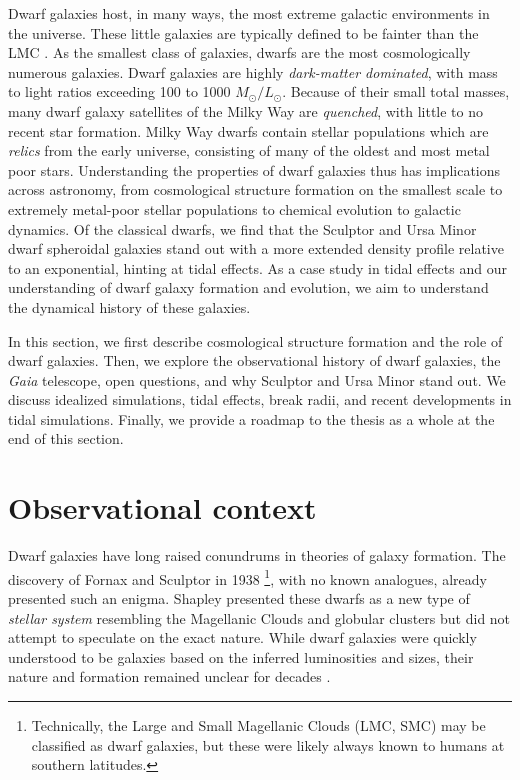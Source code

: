 Dwarf galaxies host, in many ways, the most extreme galactic
environments in the universe. These little galaxies are typically
defined to be fainter than the LMC \citep[\(M_V \gtrsim -18\) or
similarly \(L \lesssim 10^9 L_\odot\),
e.g.,][]{hodge1971, mcconnachie2012}. As the smallest class of galaxies,
dwarfs are the most cosmologically numerous galaxies. Dwarf galaxies are
highly \emph{dark-matter dominated}, with mass to light ratios exceeding
100 to 1000 \(M_\odot/ L_\odot\). Because of their small total masses,
many dwarf galaxy satellites of the Milky Way are \emph{quenched}, with
little to no recent star formation. Milky Way dwarfs contain stellar
populations which are \emph{relics} from the early universe, consisting
of many of the oldest and most metal poor stars. Understanding the
properties of dwarf galaxies thus has implications across astronomy,
from cosmological structure formation on the smallest scale to extremely
metal-poor stellar populations to chemical evolution to galactic
dynamics. Of the classical dwarfs, we find that the Sculptor and Ursa
Minor dwarf spheroidal galaxies stand out with a more extended density
profile relative to an exponential, hinting at tidal effects. As a case
study in tidal effects and our understanding of dwarf galaxy formation
and evolution, we aim to understand the dynamical history of these
galaxies.

In this section, we first describe cosmological structure formation and
the role of dwarf galaxies. Then, we explore the observational history
of dwarf galaxies, the \emph{Gaia} telescope, open questions, and why
Sculptor and Ursa Minor stand out. We discuss idealized simulations,
tidal effects, break radii, and recent developments in tidal
simulations. Finally, we provide a roadmap to the thesis as a whole at
the end of this section.

\section{Observational context}\label{observational-context}

Dwarf galaxies have long raised conundrums in theories of galaxy
formation. The discovery of Fornax and Sculptor in 1938
\citep{shapley1938}\footnote{Technically, the Large and Small Magellanic
  Clouds (LMC, SMC) may be classified as dwarf galaxies, but these were
  likely always known to humans at southern latitudes.}, with no known
analogues, already presented such an enigma. Shapley presented these
dwarfs as a new type of \emph{stellar system} resembling the Magellanic
Clouds and globular clusters but did not attempt to speculate on the
exact nature. While dwarf galaxies were quickly understood to be
galaxies based on the inferred luminosities and sizes, their nature and
formation remained unclear for decades
\citep[e.g.,][]{hodge1971, gallagher+wyse1994}.

